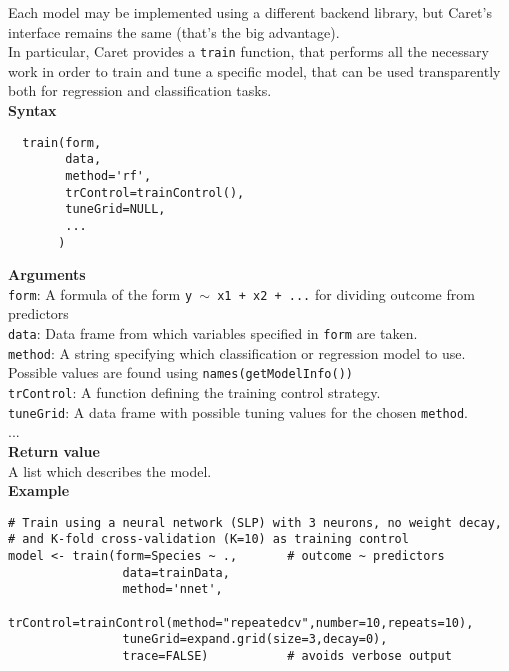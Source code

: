\documentclass{article}
\begin{document}
Each model may be implemented using a different backend library, but Caret's interface remains the same (that's the big advantage).\\

In particular, Caret provides a \texttt{train} function, that performs all the necessary work in order to train and tune a specific model, that can be used transparently both for regression and classification tasks.\\ 

\textbf{Syntax}
\begin{verbatim}
  train(form,
        data,
        method='rf',
        trControl=trainControl(),
        tuneGrid=NULL,
        ...
       )
\end{verbatim}

\textbf{Arguments}\\

\texttt{form}: A formula of the form \texttt{y $\sim$  x1 + x2 + ...} for dividing outcome from \phantom{..........}
predictors\\
\texttt{data}: Data frame from which variables specified in \texttt{form} are taken.\\
\texttt{method}: A string specifying which classification or regression model to use.\\
\phantom{..............}Possible values are found using \texttt{names(getModelInfo())}\\
\texttt{trControl}: A function defining the training control strategy.\\
\texttt{tuneGrid}: A data frame with possible tuning values for the chosen \texttt{method}.\\
...\\

\textbf{Return value}\\

A list which describes the model.\\

\textbf{Example}\\
\begin{lstlisting}
# Train using a neural network (SLP) with 3 neurons, no weight decay,
# and K-fold cross-validation (K=10) as training control
model <- train(form=Species ~ .,       # outcome ~ predictors
                data=trainData,
                method='nnet',
                trControl=trainControl(method="repeatedcv",number=10,repeats=10),
                tuneGrid=expand.grid(size=3,decay=0),
                trace=FALSE)           # avoids verbose output 
\end{lstlisting}
\end{document}
